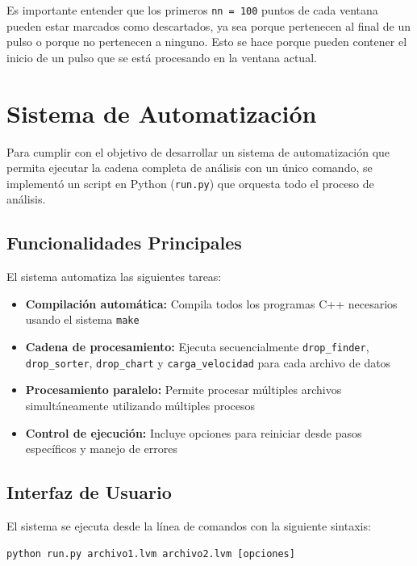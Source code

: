 \documentclass[12pt,a4paper]{article}
\begin{document}
Es importante entender que los primeros \texttt{nn = 100} puntos de cada ventana pueden estar marcados como descartados, ya sea porque pertenecen al final de un pulso o porque no pertenecen a ninguno. Esto se hace porque pueden contener el inicio de un pulso que se está procesando en la ventana actual.


\section{Sistema de Automatización}
\lhead{}

Para cumplir con el objetivo de desarrollar un sistema de automatización que permita ejecutar la cadena completa de análisis con un único comando, se implementó un script en Python (\texttt{run.py}) que orquesta todo el proceso de análisis.

\subsection{Funcionalidades Principales}

El sistema automatiza las siguientes tareas:

\begin{itemize}
    \item \textbf{Compilación automática:} Compila todos los programas C++ necesarios usando el sistema \texttt{make}
    
    \item \textbf{Cadena de procesamiento:} Ejecuta secuencialmente \texttt{drop\_finder}, \texttt{drop\_sorter}, \texttt{drop\_chart} y \texttt{carga\_velocidad} para cada archivo de datos
    
    \item \textbf{Procesamiento paralelo:} Permite procesar múltiples archivos simultáneamente utilizando múltiples procesos
    
    \item \textbf{Control de ejecución:} Incluye opciones para reiniciar desde pasos específicos y manejo de errores
\end{itemize}

\subsection{Interfaz de Usuario}

El sistema se ejecuta desde la línea de comandos con la siguiente sintaxis:

\begin{verbatim}
python run.py archivo1.lvm archivo2.lvm [opciones]
\end{verbatim}
\end{document}
